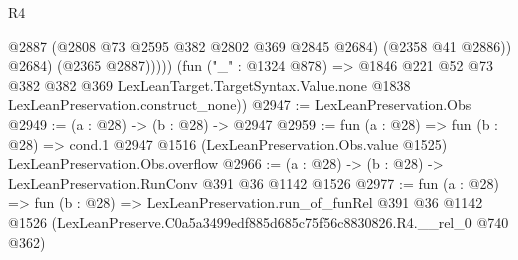 \begin{lexlean}{R4}
\begin{coremodule}
                  @2887
                  (@2808 @73 @2595 @382 @2802 @369 @2845 @2684)
                  (@2358 @41 @2886))
                @2684)
              (@2365 @2887)))))
      (fun ("_" : @1324 @878) =>
      @1846
        @221
        @52
        @73
        @382
        @382
        @369
        LexLeanTarget.TargetSyntax.Value.none
        @1838
        LexLeanPreservation.construct_none))
@2947 := LexLeanPreservation.Obs
@2949 := (a : @28) -> (b : @28) -> @2947
@2959 := fun (a : @28) =>
  fun (b : @28) =>
  cond.{1} @2947 @1516 (LexLeanPreservation.Obs.value @1525) LexLeanPreservation.Obs.overflow
@2966 := (a : @28) -> (b : @28) -> LexLeanPreservation.RunConv @391 @36 @1142 @1526
@2977 := fun (a : @28) =>
  fun (b : @28) =>
  LexLeanPreservation.run_of_funRel
    @391
    @36
    @1142
    @1526
    (LexLeanPreserve.C0a5a3499edf885d685c75f56c8830826.R4.__rel_0 @740 @362)
\end{coremodule}
\end{lexlean}
